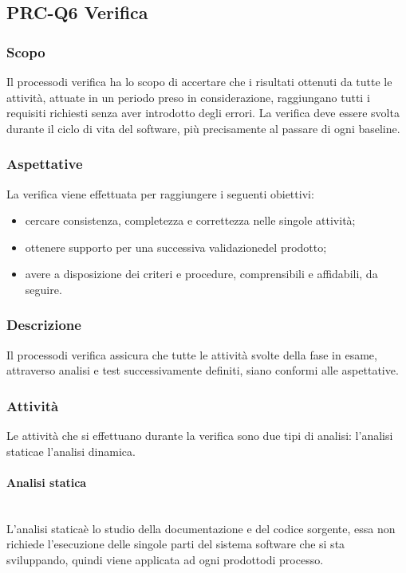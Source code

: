 \subsection{PRC-Q6 Verifica}
\subsubsection{Scopo}
Il processo\glosp di verifica ha lo scopo di accertare che i risultati ottenuti da tutte le attività, attuate in un periodo preso in considerazione, raggiungano tutti i requisiti richiesti senza aver introdotto degli errori. La verifica deve essere svolta durante il ciclo di vita del software, più precisamente al passare di ogni baseline\glo.
\subsubsection{Aspettative}
La verifica viene effettuata per raggiungere i seguenti obiettivi:
\begin{itemize}
	\item cercare consistenza, completezza e correttezza nelle singole attività;
	\item ottenere supporto per una successiva validazione\glosp del prodotto\glo;
	\item avere a disposizione dei criteri e procedure, comprensibili e affidabili, da seguire.
\end{itemize}
\subsubsection{Descrizione}
Il processo\glosp di verifica assicura che tutte le attività svolte della fase in esame, attraverso analisi e test successivamente definiti, siano conformi alle aspettative.
\subsubsection{Attività}
Le attività che si effettuano durante la verifica sono due tipi di analisi: l'analisi statica\glosp e l'analisi dinamica. \\[2mm]
\paragraph{Analisi statica}\mbox{}\\ [1mm]
L'analisi statica\glosp è lo studio della documentazione e del codice sorgente, essa non richiede l'esecuzione delle singole parti del sistema software che si sta sviluppando, quindi viene applicata ad ogni prodotto\glosp di processo\glo.
